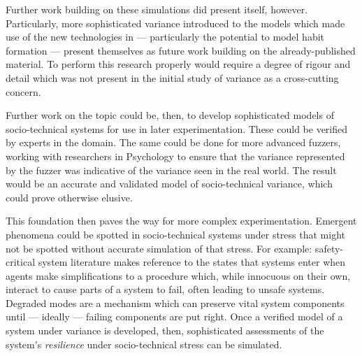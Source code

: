 \documentclass{article}
\begin{document}
Further work building on these simulations did present itself, however.
Particularly, more sophisticated variance introduced to the models which made
use of the new technologies in \pdsf{} --- particularly the potential to model
habit formation --- present themselves as future work building on the
already-published material. To perform this research properly would require a
degree of rigour and detail which was not present in the initial study of
variance as a cross-cutting concern.\par

Further work on the topic could be, then, to develop sophisticated models of
socio-technical systems for use in later experimentation. These could be
verified by experts in the domain. The same could be done for more advanced
fuzzers, working with researchers in Psychology to ensure that the variance
represented by the fuzzer was indicative of the variance seen in the real world.
The result would be an accurate and validated model of socio-technical variance,
which could prove otherwise elusive.\par

This foundation then paves the way for more complex experimentation. Emergent
phenomena could be spotted in socio-technical systems under stress that might
not be spotted without accurate simulation of that stress. For example:
safety-critical system literature makes reference to the states that systems
enter when agents make simplifications to a procedure which, while innocuous on
their own, interact to cause parts of a system to fail, often leading to unsafe
systems\cite{johnson_shea_rail}. Degraded modes are a mechanism which can
preserve vital system components until --- ideally --- failing components are
put right. Once a verified model of a system under variance is developed, then,
sophisticated assessments of the system's \emph{resilience} under
socio-technical stress can be simulated.\par
\end{document}
